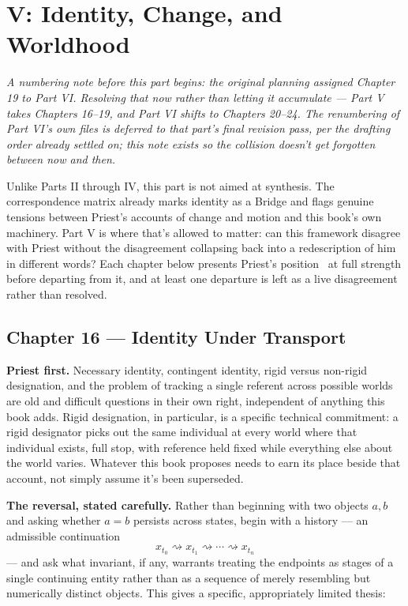 \part{V: Identity, Change, and Worldhood}\label{part-v-identity-change-and-worldhood}

\emph{A numbering note before this part begins: the original planning
assigned Chapter 19 to Part VI. Resolving that now rather than letting it
accumulate --- Part V takes Chapters 16--19, and Part VI shifts to
Chapters 20--24. The renumbering of Part VI's own files is deferred to
that part's final revision pass, per the drafting order already settled
on; this note exists so the collision doesn't get forgotten between now
and then.}

Unlike Parts II through IV, this part is not aimed at synthesis. The
correspondence matrix already marks identity as a Bridge and flags
genuine tensions between Priest's accounts of change and motion and this
book's own machinery. Part V is where that's allowed to matter: can this
framework disagree with Priest without the disagreement collapsing back
into a redescription of him in different words? Each chapter below
presents Priest's position~\cite{priest2006} at full strength before departing from it, and
at least one departure is left as a live disagreement rather than
resolved.

\hypertarget{chapter-16-identity-under-transport}{%
\chapter*{Chapter 16 --- Identity Under Transport}
\label{chapter-16-identity-under-transport}}

\textbf{Priest first.} Necessary identity, contingent identity, rigid versus
non-rigid designation, and the problem of tracking a single referent
across possible worlds are old and difficult questions in their own
right, independent of anything this book adds. Rigid designation, in
particular, is a specific technical commitment: a rigid designator picks
out the same individual at every world where that individual exists,
full stop, with reference held fixed while everything else about the
world varies. Whatever this book proposes needs to earn its place beside
that account, not simply assume it's been superseded.

\textbf{The reversal, stated carefully.} Rather than beginning with two
objects \(a, b\) and asking whether \(a = b\) persists across states, begin
with a history --- an admissible continuation
\[x_{t_0} \rightsquigarrow x_{t_1} \rightsquigarrow \cdots \rightsquigarrow x_{t_n}\]
--- and ask what invariant, if any, warrants treating the endpoints as
stages of a single continuing entity rather than as a sequence of merely
resembling but numerically distinct objects. This gives a specific,
appropriately limited thesis:

